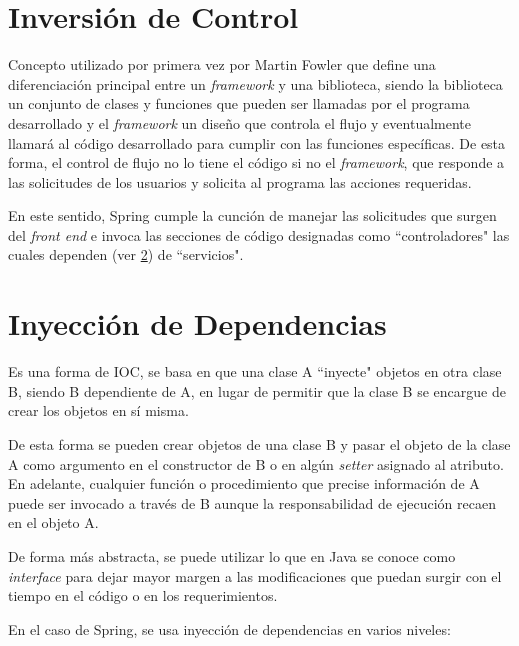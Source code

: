     \section{Inversión de Control}
    
    Concepto utilizado por primera vez por Martin Fowler\cite{IOC-dgarcia} que define una diferenciación principal entre un \textit{framework} y una biblioteca, siendo la biblioteca un conjunto de clases y funciones que pueden ser llamadas por el programa desarrollado y el \textit{framework} un diseño que controla el flujo y eventualmente llamará al código desarrollado para cumplir con las funciones específicas. De esta forma, el control de flujo no lo tiene el código si no el \textit{framework}, que responde a las solicitudes de los usuarios y solicita al programa las acciones requeridas.
    
    En este sentido, Spring cumple la cunción de manejar las solicitudes que surgen del \textit{front end} e invoca las secciones de código designadas como ``controladores" las cuales dependen (ver \ref{teorico-di}) de ``servicios".
    
    \section{Inyección de Dependencias}
    \label{teorico-di}
    
    Es una forma de IOC, se basa en que una clase A ``inyecte" objetos en otra clase B, siendo B dependiente de A, en lugar de permitir que la clase B se encargue de crear los objetos en sí misma\cites{IOC-mpachano}{IOC-dgarcia}.
    
    De esta forma se pueden crear objetos de una clase B y pasar el objeto de la clase A como argumento en el constructor de B o en algún \textit{setter} asignado al atributo. En adelante, cualquier función o procedimiento que precise información de A puede ser invocado a través de B aunque la responsabilidad de ejecución recaen en el objeto A.
    
    De forma más abstracta, se puede utilizar lo que en Java se conoce como \textit{interface} para dejar mayor margen a las modificaciones que puedan surgir con el tiempo en el código o en los requerimientos.
    
    En el caso de Spring, se usa inyección de dependencias en varios niveles:
    
